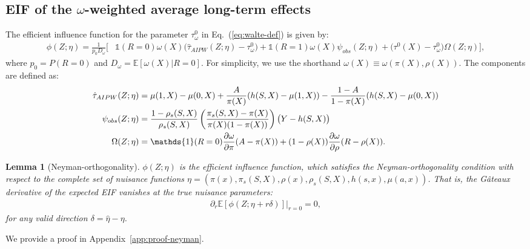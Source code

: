 \documentclass{article}
\theoremstyle{plain}
\newtheorem{lemma}[theorem]{Lemma}
\theoremstyle{definition}
\theoremstyle{remark}
\newcommand{\1}{\mathds{1}}                %
\begin{document}
\subsection{EIF of the $\omega$-weighted average long-term effects}
\label{app:EIF-weighted-ATE}
The efficient influence function for the parameter $\tau^0_\omega$ in Eq.~(\ref{eq:walte-def}) is given by:
\begin{align}
\label{eq:eif-explicit}
\phi(Z; \eta) = \frac{1}{p_0 D_\omega} \Bigg[ &\1(R=0) \omega(X) \big( \hat{\tau}_{AIPW}(Z;\eta) - \tau^0_\omega \big) 
+ \1(R=1) \omega(X) \psi_{obs}(Z;\eta) + \big( \tau^0(X) - \tau^0_\omega \big) \Omega(Z;\eta) \Bigg],
\end{align}
where $p_0 = P(R=0)$ and $D_\omega = \mathbb{E}[\omega(X)|R=0]$. For simplicity, we use the shorthand $\omega(X) \equiv \omega(\pi(X), \rho(X))$. The components are defined as:
\begin{align}
    \hat{\tau}_{AIPW}(Z;\eta) &= \mu(1,X) - \mu(0,X) \notag  + \frac{A}{\pi(X)}(h(S,X) - \mu(1,X)) - \frac{1-A}{1-\pi(X)}(h(S,X) - \mu(0,X)) \\
    \psi_{obs}(Z;\eta) &= \frac{1-\rho_s(S,X)}{\rho_s(S,X)} \left( \frac{\pi_s(S,X) - \pi(X)}{\pi(X)(1-\pi(X))} \right) \big( Y - h(S,X) \big) \\
    \Omega(Z;\eta) &= \1(R=0) \frac{\partial \omega}{\partial \pi} (A - \pi(X)) + (1-\rho(X)) \frac{\partial \omega}{\partial \rho} (R - \rho(X)).
\end{align}

\begin{lemma}[Neyman-orthogonality]
\label{lemma:orthogonality}
    $\phi(Z; \eta)$ is the efficient influence function, which satisfies the Neyman-orthogonality condition with respect to the complete set of nuisance functions $\eta = (\pi(x), \pi_s(S,X), \rho(x), \rho_s(S,X), h(s,x), \mu(a,x))$. That is, the G\^ateaux derivative of the expected EIF vanishes at the true nuisance parameters:
    \begin{align}
        \partial_r \mathbb{E}\left[ \phi(Z; \eta + r\delta) \right] \big|_{r=0} = 0,
    \end{align}
    for any valid direction $\delta = \hat{\eta} - \eta$.
\end{lemma}
We provide a proof in Appendix~\ref{app:proof-neyman}.

\end{document}
